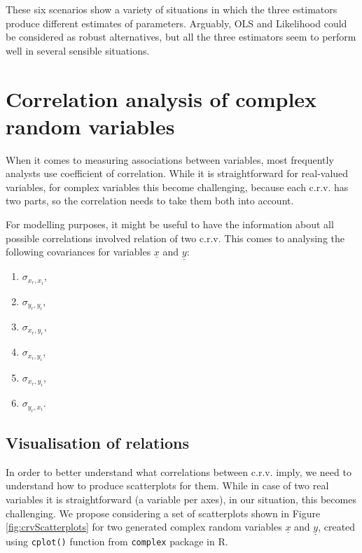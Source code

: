 \documentclass[
]{book}
\providecommand{\tightlist}{%
  \setlength{\itemsep}{0pt}\setlength{\parskip}{0pt}}
\begin{document}
These six scenarios show a variety of situations in which the three estimators produce different estimates of parameters. Arguably, OLS and Likelihood could be considered as robust alternatives, but all the three estimators seem to perform well in several sensible situations.

\hypertarget{correlationAnalysis}{%
\chapter{Correlation analysis of complex random variables}\label{correlationAnalysis}}

When it comes to measuring associations between variables, most frequently analysts use coefficient of correlation. While it is straightforward for real-valued variables, for complex variables this become challenging, because each c.r.v. has two parts, so the correlation needs to take them both into account.

For modelling purposes, it might be useful to have the information about all possible correlations involved relation of two c.r.v. This comes to analysing the following covariances for variables \(\underline{x}\) and \(\underline{y}\):

\begin{enumerate}
\def\labelenumi{\arabic{enumi}.}
\tightlist
\item
  \(\sigma_{x_r,x_i}\),
\item
  \(\sigma_{y_r,y_i}\),
\item
  \(\sigma_{x_r,y_r}\),
\item
  \(\sigma_{x_i,y_i}\),
\item
  \(\sigma_{x_r,y_i}\),
\item
  \(\sigma_{y_r,x_i}\).
\end{enumerate}

\hypertarget{correlationVisual}{%
\section{Visualisation of relations}\label{correlationVisual}}

In order to better understand what correlations between c.r.v. imply, we need to understand how to produce scatterplots for them. While in case of two real variables it is straightforward (a variable per axes), in our situation, this becomes challenging. We propose considering a set of scatterplots shown in Figure \ref{fig:crvScatterplots} for two generated complex random variables \(\underline{x}\) and \(\underline{y}\), created using \texttt{cplot()} function from \texttt{complex} package in R.
\end{document}
